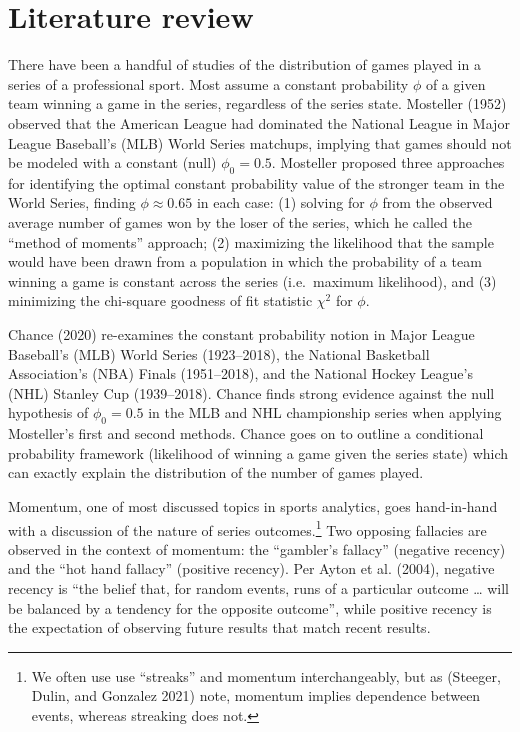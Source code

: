 \documentclass{article}
\begin{document}
\hypertarget{literature-review}{%
\section{Literature review}\label{literature-review}}

There have been a handful of studies of the distribution of games played
in a series of a professional sport. Most assume a constant probability
\(\phi\) of a given team winning a game in the series, regardless of the
series state. Mosteller (1952) observed that the American League had
dominated the National League in Major League Baseball's (MLB) World
Series matchups, implying that games should not be modeled with a
constant (null) \(\phi_0 = 0.5\). Mosteller proposed three approaches
for identifying the optimal constant probability value of the stronger
team in the World Series, finding \(\phi \approx 0.65\) in each case:
(1) solving for \(\phi\) from the observed average number of games won
by the loser of the series, which he called the ``method of moments''
approach; (2) maximizing the likelihood that the sample would have been
drawn from a population in which the probability of a team winning a
game is constant across the series (i.e.~maximum likelihood), and (3)
minimizing the chi-square goodness of fit statistic \(\chi^2\) for
\(\phi\).

Chance (2020) re-examines the constant probability notion in Major
League Baseball's (MLB) World Series (1923--2018), the National
Basketball Association's (NBA) Finals (1951--2018), and the National
Hockey League's (NHL) Stanley Cup (1939--2018). Chance finds strong
evidence against the null hypothesis of \(\phi_0 = 0.5\) in the MLB and
NHL championship series when applying Mosteller's first and second
methods. Chance goes on to outline a conditional probability framework
(likelihood of winning a game given the series state) which can exactly
explain the distribution of the number of games played.

Momentum, one of most discussed topics in sports analytics, goes
hand-in-hand with a discussion of the nature of series
outcomes.\footnote{We often use use ``streaks'' and momentum
  interchangeably, but as (Steeger, Dulin, and Gonzalez 2021) note,
  momentum implies dependence between events, whereas streaking does
  not.} Two opposing fallacies are observed in the context of momentum:
the ``gambler's fallacy'' (negative recency) and the ``hot hand
fallacy'' (positive recency). Per Ayton et al. (2004), negative recency
is ``the belief that, for random events, runs of a particular outcome
\ldots{} will be balanced by a tendency for the opposite outcome'',
while positive recency is the expectation of observing future results
that match recent results.
\end{document}
